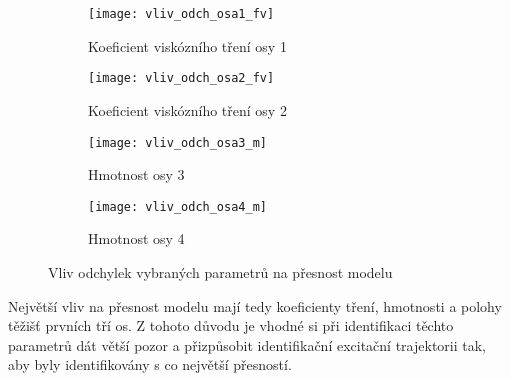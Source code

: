 \begin{figure}[h]
    \centering
    \begin{subfigure}[b]{1\textwidth}
        \texttt{[image: vliv\_odch\_osa1\_fv]}
        \caption{Koeficient viskózního tření osy 1}
        \label{vliv_odch_1}
    \end{subfigure}
    \begin{subfigure}[b]{1\textwidth}
        \texttt{[image: vliv\_odch\_osa2\_fv]}
        \caption{Koeficient viskózního tření osy 2}
        \label{vliv_odch_2}
    \end{subfigure}
    \begin{subfigure}[b]{1\textwidth}
        \texttt{[image: vliv\_odch\_osa3\_m]}
        \caption{Hmotnost osy 3}
        \label{vliv_odch_3}
    \end{subfigure}
    \begin{subfigure}[b]{1\textwidth}
        \texttt{[image: vliv\_odch\_osa4\_m]}
        \caption{Hmotnost osy 4}
        \label{vliv_odch_4}
    \end{subfigure}
    \caption{Vliv odchylek vybraných parametrů na přesnost modelu}
\end{figure} 

\clearpage

Největší vliv na přesnost modelu mají tedy koeficienty tření, hmotnosti a polohy těžišť prvních tří os. Z tohoto důvodu je vhodné si při identifikaci těchto parametrů dát větší pozor a přizpůsobit identifikační excitační trajektorii tak, aby byly identifikovány s co největší přesností.   